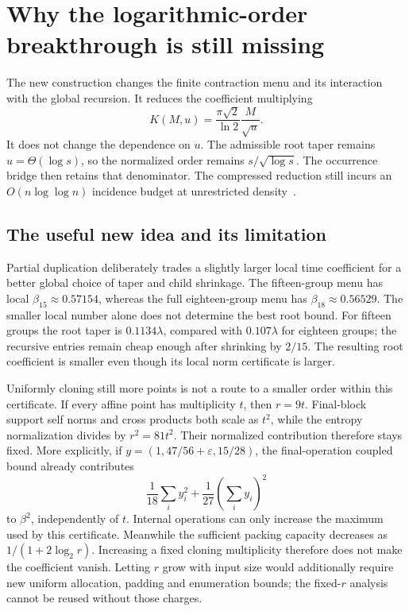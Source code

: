 \section{Why the logarithmic-order breakthrough is still missing}
\label{sec:limits}

The new construction changes the finite contraction menu and its interaction
with the global recursion. It reduces the coefficient multiplying
\[
 K(M,u)=\frac{\pi\sqrt2}{\ln2}\frac{M}{\sqrt u}.
\]
It does not change the dependence on $u$. The admissible root taper remains
$u=\Theta(\log s)$, so the normalized order remains
$s/\sqrt{\log s}$. The occurrence bridge then retains that denominator.
The compressed reduction still incurs an $O(n\log\log n)$ incidence
budget at unrestricted density~\cite{upstream,degree}.

\subsection{The useful new idea and its limitation}

Partial duplication deliberately trades a slightly larger local time
coefficient for a better global choice of taper and child shrinkage.
The fifteen-group menu has local $\beta_{15}\approx0.57154$, whereas
the full eighteen-group menu has $\beta_{18}\approx0.56529$.
The smaller local number alone does not determine the best root bound.
For fifteen groups the root taper is $0.1134\lambda$, compared with
$0.107\lambda$ for eighteen groups; the recursive entries remain cheap
enough after shrinking by $2/15$. The resulting root coefficient is smaller
even though its local norm certificate is larger.

Uniformly cloning still more points is not a route to a smaller order
within this certificate. If every affine point has multiplicity $t$, then
$r=9t$. Final-block support self norms and cross products both scale as
$t^2$, while the entropy normalization divides by $r^2=81t^2$.
Their normalized contribution therefore stays fixed. More explicitly,
if $y=(1,47/56+\varepsilon,15/28)$, the final-operation coupled bound
already contributes
\[
 \frac1{18}\sum_i y_i^2+\frac1{27}\left(\sum_i y_i\right)^2
\]
to $\beta^2$, independently of $t$. Internal operations can only increase
the maximum used by this certificate. Meanwhile the sufficient packing
capacity decreases as $1/(1+2\log_2r)$. Increasing a fixed cloning
multiplicity therefore does not make the coefficient vanish. Letting $r$
grow with input size would additionally require new uniform allocation,
padding and enumeration bounds; the fixed-$r$ analysis cannot be reused
without those charges.

